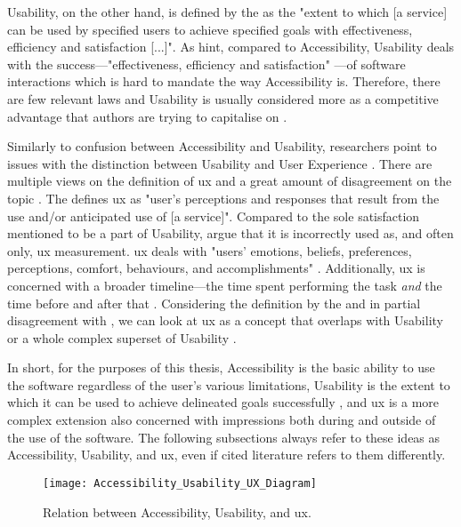 Usability, on the other hand, is defined by the \textcite{ISO_9241-11:2018} as the "extent to which [a service] can be used by specified users to achieve specified goals with effectiveness, efficiency and satisfaction [...]".
As \textcite{Wegge_Zimmermann_2007} hint, compared to Accessibility, Usability deals with the success---"effectiveness, efficiency and satisfaction" \parencite{ISO_9241-11:2018}---of software interactions which is hard to mandate the way Accessibility is.
Therefore, there are few relevant laws and Usability is usually considered more as a competitive advantage that authors are trying to capitalise on \parencite{Wegge_Zimmermann_2007}.

Similarly to confusion between Accessibility and Usability, researchers point to issues with the distinction between Usability and User Experience \parencite{Darin_et_all_2019, Juergen_et_all_2020}.
There are multiple views on the definition of \gls{ux} and a great amount of disagreement on the topic \parencite{Juergen_et_all_2020}.
The \textcite{ISO_9241-11:2018} defines \gls{ux} as "user’s perceptions and responses that result from the use and/or anticipated use of [a service]".
Compared to the sole satisfaction mentioned to be a part of Usability, \textcite{Darin_et_all_2019} argue that it is incorrectly used as, and often only, \gls{ux} measurement. \gls{ux} deals with "users’ emotions, beliefs, preferences, perceptions, comfort, behaviours, and accomplishments" \parencite{ISO_9241-11:2018}.
Additionally, \gls{ux} is concerned with a broader timeline---the time spent performing the task \emph{and} the time before and after that \parencite{Juergen_et_all_2020,ISO_9241-11:2018}.
Considering the definition by the \textcite{ISO_9241-11:2018} and in partial disagreement with \textcite{Darin_et_all_2019}, we can look at \gls{ux} as a concept that overlaps with Usability or a whole complex superset of Usability \parencite{Juergen_et_all_2020}.

In short, for the purposes of this thesis, Accessibility is the basic ability to use the software regardless of the user's various limitations, Usability is the extent to which it can be used to achieve delineated goals successfully \parencite{ISO_9241-11:2018}, and \gls{ux} is a more complex extension also concerned with impressions both during and outside of the use of the software.
The following subsections always refer to these ideas as Accessibility, Usability, and \gls{ux}, even if cited literature refers to them differently.

\begin{figure}[H]
    \centering
    \texttt{[image: Accessibility\_Usability\_UX\_Diagram]}
    \caption{Relation between Accessibility, Usability, and \gls{ux}.}
    \label{fig:hsie-relations}
\end{figure}

